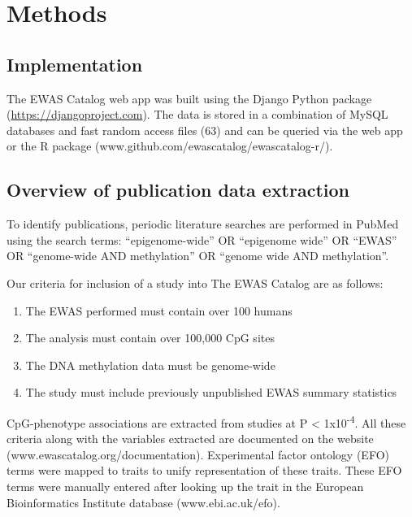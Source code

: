 \documentclass[11pt,oneside]{bristolthesis}
\providecommand{\tightlist}{%
  \setlength{\itemsep}{0pt}\setlength{\parskip}{0pt}}
\begin{document}
\hypertarget{methods-03}{%
\section{Methods}\label{methods-03}}

\hypertarget{implementation}{%
\subsection{Implementation}\label{implementation}}

The EWAS Catalog web app was built using the Django Python package (\url{https://djangoproject.com}). The data is stored in a combination of MySQL databases and fast random access files (63) and can be queried via the web app or the R package (www.github.com/ewascatalog/ewascatalog-r/).

\hypertarget{overview-of-publication-data-extraction}{%
\subsection{Overview of publication data extraction}\label{overview-of-publication-data-extraction}}

To identify publications, periodic literature searches are performed in PubMed using the search terms: ``epigenome-wide'' OR ``epigenome wide'' OR ``EWAS'' OR ``genome-wide AND methylation'' OR ``genome wide AND methylation''.

Our criteria for inclusion of a study into The EWAS Catalog are as follows:
\begin{enumerate}
\def\labelenumi{\arabic{enumi}.}
\tightlist
\item
  The EWAS performed must contain over 100 humans
\item
  The analysis must contain over 100,000 CpG sites
\item
  The DNA methylation data must be genome-wide
\item
  The study must include previously unpublished EWAS summary statistics
\end{enumerate}
CpG-phenotype associations are extracted from studies at P \textless{} 1x10\textsuperscript{-4}. All these criteria along with the variables extracted are documented on the website (www.ewascatalog.org/documentation). Experimental factor ontology (EFO) terms were mapped to traits to unify representation of these traits. These EFO terms were manually entered after looking up the trait in the European Bioinformatics Institute database (www.ebi.ac.uk/efo).
\end{document}
